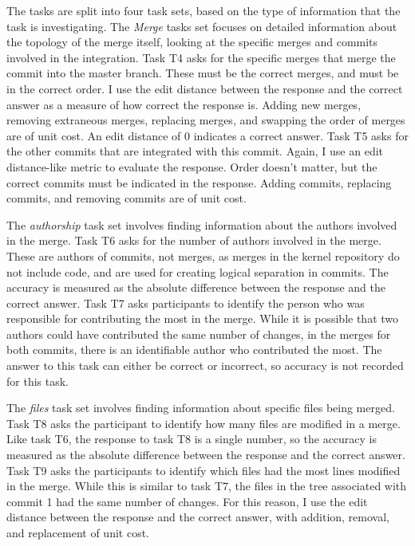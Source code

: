 The tasks are split into four task sets, based on the type of
information that the task is investigating. The \emph{Merge} tasks set
focuses on detailed information about the topology of the merge itself,
looking at the specific merges and commits involved in the integration.
Task T4 asks for the specific merges that merge the commit into the
master branch. These must be the correct merges, and must be in the
correct order. I use the edit distance between the response and the
correct answer as a measure of how correct the response is. Adding new
merges, removing extraneous merges, replacing merges, and swapping the
order of merges are of unit cost. An edit distance of 0 indicates a
correct answer. Task T5 asks for the other commits that are integrated
with this commit. Again, I use an edit distance-like metric to evaluate
the response. Order doesn't matter, but the correct commits must be
indicated in the response. Adding commits, replacing commits, and
removing commits are of unit cost.

The \emph{authorship} task set involves finding information about the
authors involved in the merge. Task T6 asks for the number of authors
involved in the merge. These are authors of commits, not merges, as
merges in the kernel repository do not include code, and are used for
creating logical separation in commits. The accuracy is measured as the
absolute difference between the response and the correct answer. Task T7
asks participants to identify the person who was responsible for
contributing the most in the merge. While it is possible that two
authors could have contributed the same number of changes, in the merges
for both commits, there is an identifiable author who contributed the
most. The answer to this task can either be correct or incorrect, so
accuracy is not recorded for this task.

The \emph{files} task set involves finding information about specific
files being merged. Task T8 asks the participant to identify how many
files are modified in a merge. Like task T6, the response to task T8 is
a single number, so the accuracy is measured as the absolute difference
between the response and the correct answer. Task T9 asks the
participants to identify which files had the most lines modified in
the merge. While this is similar to task T7, the files in the tree
associated with commit 1 had the same number of changes. For this
reason, I use the edit distance between the response and the correct
answer, with addition, removal, and replacement of unit cost.

